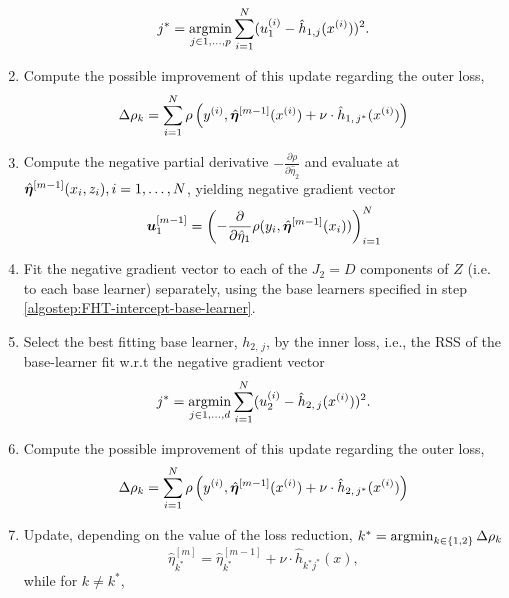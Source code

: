 \begin{enumerate}
\begin{equation}
            j^*=\operatorname*{argmin}_{j\in 1,\ldots,p}\sum_{i=1}^N(u_1^{(i)}-\hat{h}_{1,j}(x^{(i)}))^2.
        \end{equation}
    \item
        Compute the possible improvement of this update regarding the outer loss,
        \begin{equation}
            \Delta\rho_k=\sum_{i=1}^N\rho\left(y^{(i)}, \hat{\boldsymbol{\eta}}^{[m-1]}(x^{(i)}) + \nu \cdot \hat{h}_{1,\,j^*}(x^{(i)}) \right)
        \end{equation}
    \item
        Compute the negative partial derivative $-\frac{\partial\rho}{\partial \hat{\eta}_2}$
        and evaluate at $\hat{\boldsymbol{\eta}}^{[m-1]}(x_i,z_i),i=1,\ldots,N$, yielding negative gradient vector
        \begin{equation}
            \bm{u}^{[m-1]}_1=\left(-\frac{\partial}{\partial \hat{\eta}_1}\rho(y_i, \hat{\boldsymbol{\eta}}^{[m-1]}(x_i))\right)_{i=1}^N
        \end{equation}
    \item
        Fit the negative gradient vector to each of the $J_2=D$ components of $Z$ (i.e. to each base learner) separately, using the base learners specified in step \ref{algostep:FHT-intercept-base-learner}.
    \item
        Select the best fitting base learner, $h_{2,\,j}$, by the inner loss,
        i.e., the RSS of the base-learner fit w.r.t the negative gradient vector
        \begin{equation}
            j^*=\operatorname*{argmin}_{j\in 1,\ldots,d}\sum_{i=1}^N(u_2^{(i)}-\hat{h}_{2,\,j}(x^{(i)}))^2.
        \end{equation}
    \item
        Compute the possible improvement of this update regarding the outer loss,
        \begin{equation}
            \Delta\rho_k=\sum_{i=1}^N\rho\left(y^{(i)}, \hat{\boldsymbol{\eta}}^{[m-1]}(x^{(i)}) + \nu \cdot \hat{h}_{2,\,j^*}(x^{(i)}) \right)
        \end{equation}
    \item\label{algostep:FHT-intercept-end}
        Update, depending on the value of the loss reduction, $k^*=\operatorname*{argmin}_{k\in\{1,2\}}\Delta\rho_k$
        \begin{equation}
            \hat{\eta}^{[m]}_{k^*}=\hat{\eta}^{[m-1]}_{k^*}+\nu\cdot\hat{h}_{k^*j^*}(x),
        \end{equation}
        while for $k\neq k^*$,
        \begin{equation}

\end{equation}
\end{enumerate}

